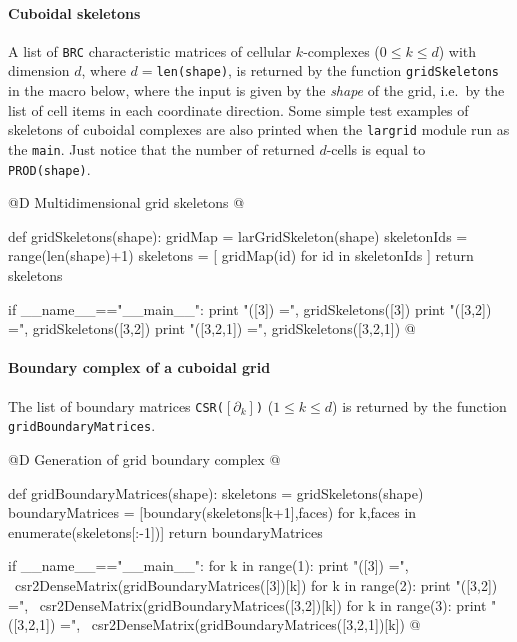 \documentclass[11pt,oneside]{article}	%
\begin{document}
\paragraph{Cuboidal skeletons}
A list of \texttt{BRC} characteristic matrices of cellular $k$-complexes ($0\leq k\leq d$) with dimension $d$, where $d={}$\texttt{len(shape)}, is returned by the function \texttt{gridSkeletons} in the macro below, where the input is given by the \emph{shape} of the grid, i.e.~by the list of cell items in each coordinate direction. Some simple test examples of skeletons of cuboidal complexes are also printed when the \texttt{largrid} module run as the \texttt{main}. Just notice that the number of returned $d$-cells is equal to \texttt{PROD(shape)}.

@D Multidimensional grid skeletons
@{def gridSkeletons(shape):
	gridMap = larGridSkeleton(shape)
	skeletonIds = range(len(shape)+1)
	skeletons = [ gridMap(id) for id in skeletonIds ]
	return skeletons
	
if __name__=="__main__":
	print "\ngridSkeletons([3]) =\n", gridSkeletons([3])
	print "\ngridSkeletons([3,2]) =\n", gridSkeletons([3,2])
	print "\ngridSkeletons([3,2,1]) =\n", gridSkeletons([3,2,1])
@}

\paragraph{Boundary complex of a cuboidal grid}
The list of boundary matrices \texttt{CSR($[\partial_k]$)} ($1\leq k\leq d$) is returned by the function
\texttt{gridBoundaryMatrices}.

@D Generation of grid boundary complex
@{def gridBoundaryMatrices(shape):
	skeletons = gridSkeletons(shape)
	boundaryMatrices = [boundary(skeletons[k+1],faces) 
						 for k,faces in enumerate(skeletons[:-1])]
	return boundaryMatrices
	
if __name__=="__main__":
	for k in range(1):
		print "\ngridBoundaryMatrices([3]) =\n", \
				csr2DenseMatrix(gridBoundaryMatrices([3])[k])
	for k in range(2):
		print "\ngridBoundaryMatrices([3,2]) =\n", \
				csr2DenseMatrix(gridBoundaryMatrices([3,2])[k])
	for k in range(3):
		print "\ngridBoundaryMatrices([3,2,1]) =\n", \
				csr2DenseMatrix(gridBoundaryMatrices([3,2,1])[k])
@}
\end{document}

